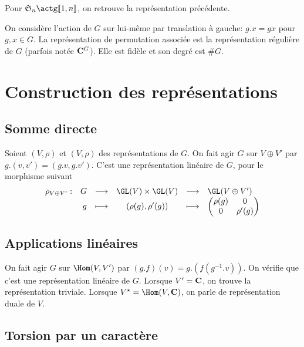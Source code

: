 \begin{ex}
    Pour $\gS_n\actg \llbracket 1, n \rrbracket $, on retrouve la représentation précédente.
\end{ex}

\begin{ex}
    On considère l'action de $G$ sur  lui-même par translation à gauche:  $g.x=gx$ pour  $g,x \in  G$. La représentation de permutation associée est la représentation régulière de  $G$ (parfois notée $ \mathbf C^G$). Elle est fidèle et son degré est $\#G$.
\end{ex}

\section{Construction des représentations}

\subsection{Somme directe}

Soient $(V, \rho)$ et $(V, \rho)$ des représentations de  $G$. On fait agir  $G$ sur  $V\oplus V'$ par  $g.(v, v')=(g.v, g.v')$. C'est une représentation linéaire de  $G$, pour le morphisme suivant  \[
\begin{array}{rrcccl}
    \rho_{V\oplus V'}:& G & \longrightarrow & \GL(V)\times \GL(V) & \longrightarrow & \GL(V\oplus V') \\
                      & g & \longmapsto & (\rho(g), \rho'(g)) &\longmapsto&\displaystyle \begin{pmatrix}
                          \rho(g) & 0 \\ 0 & \rho'(g)
                      \end{pmatrix}
\end{array}
\] 

\subsection{Applications linéaires}

On fait agir $G$ sur  $\Hom(V, V')$ par $(g.f)(v)=g.(f(g^{-1}.v))$. On vérifie que c'est une représentation linéaire de $G$. Lorsque  $V'=\mathbf C$, on trouve la représentation triviale. Lorsque $V^\star =\Hom(V, \C)$, on parle de représentation duale de $V$.

\subsection{Torsion par un caractère}


